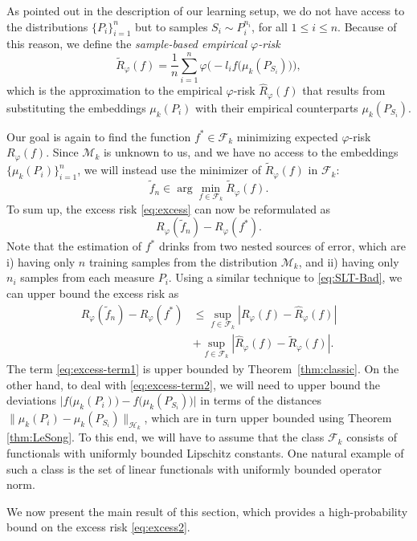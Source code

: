 \documentclass{article}
\renewcommand{\H}{\mathcal{H}}
\newcommand{\F}{\mathcal{F}}
\newcommand{\M}{\mathscr{M}}
\newcommand{\Rp}{R_{\varphi}}
\newcommand{\Rpn}{\hat{R}_{\varphi}}
\newcommand{\Rpnt}{\tilde{R}_{\varphi}}
\newcommand{\f}{f^*}
\newcommand{\fnt}{\tilde{f}_n}
\begin{document}
As pointed out in the description of our learning setup, we do not have 
access to the distributions $\{P_i\}_{i=1}^n$ but to samples $S_i \sim
P_i^{n_i}$, for all $1 \leq i \leq n$.  Because of this reason, we define the
\emph{sample-based empirical $\varphi$-risk}
\[
\Rpnt(f) = \frac{1}{n}\sum_{i=1}^n \varphi\bigl(-l_i f\bigl(\mu_k(P_{S_i})\bigr)\bigr),
\]
which is the approximation to the empirical $\varphi$-risk $\Rpn(f)$ that
results from substituting the embeddings $\mu_k(P_i)$ with their empirical
counterparts $\mu_k(P_{S_i})$.

Our goal is again to find the function $\f\in\F_k$ minimizing expected
$\varphi$-risk $\Rp(f)$.  Since $\M_k$ is unknown to us, and we have no access
to the embeddings $\{\mu_k(P_i)\}_{i=1}^n$, we will instead use the minimizer
of $\Rpnt(f)$ in $\F_k$:
\begin{equation}
\label{eq:sample-based-erm}
\fnt \in \arg\min_{f\in \F_k} \Rpnt(f).
\end{equation}
To sum up, the excess risk \eqref{eq:excess} can now be reformulated as
\begin{equation}
\label{eq:excess2}
\Rp(\fnt) - \Rp(\f).
\end{equation}
Note that the estimation of $\f$ drinks from two nested sources of error, which
are i) having only $n$ training samples from the distribution $\M_k$, and ii)
having only $n_i$ samples from each measure $P_i$.  Using a similar technique
to \eqref{eq:SLT-Bad}, we can upper bound the excess risk as
\begin{align}
\label{eq:excess-term1}
\Rp(\fnt) - \Rp(\f)
&\leq
\sup_{f\in\F_k}|\Rp(f) - \Rpn(f)|\\
\label{eq:excess-term2}
&+
\sup_{f\in\F_k}|\Rpn(f) - \Rpnt(f)|.
\end{align}
The term \eqref{eq:excess-term1} is upper bounded by Theorem~\ref{thm:classic}.
On the other hand, to deal with \eqref{eq:excess-term2}, we will need to upper
bound the deviations
$\bigl|f\bigl(\mu_k(P_i)\bigr)-f\bigl(\mu_k(P_{S_i})\bigr)\bigr|$ in terms of
the distances $\|\mu_k(P_i) - \mu_k(P_{S_i})\|_{\H_k}$, which are in turn upper
bounded using Theorem \ref{thm:LeSong}.  To this end, we will have to assume
that the class $\F_k$ consists of functionals with uniformly bounded Lipschitz
constants.  One natural example of such a class is the set of linear
functionals with uniformly bounded operator norm.

We now present the main result of this section, which provides a
high-probability bound on the excess risk \eqref{eq:excess2}. 
\end{document}
